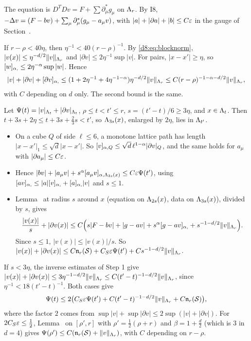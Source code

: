 \begin{detail}\label{d8:scalar}
The equation is $D^TDv=F+\sum\partial^*_\mu g_\mu$ on $\Lambda_r$. By I8, $-\Delta v=(F-bv)+\sum_\mu\partial^*_\mu(g_\mu-a_\mu v)$, with $|a|+|\partial a|+|b|\le C\varepsilon$ in the gauge of Section~.
\begin{step}
If $r-\rho<40\eta$, then $\eta^{-1}<40(r-\rho)^{-1}$. By \eqref{d8:eq:blocknorm}, $|v(x)|\le\eta^{-d/2}\|v\|_{\Lambda_r}$ and $|\partial v|\le2\eta^{-1}\sup|v|$. For pairs, $|x-x'|\ge\eta$, so $[w]_{\alpha,}\le2\eta^{-\alpha}\sup|w|$. Hence
\[
|v|+|\partial v|+[\partial v]_{\alpha,}\le(1+2\eta^{-1}+4\eta^{-1-\alpha})\eta^{-d/2}\|v\|_{\Lambda_r}\le C(r-\rho)^{-1-\alpha-d/2}\|v\|_{\Lambda_r},
\]
with $C$ depending on $d$ only. The second bound is the same.
\end{step}
\begin{step}
Let $\Psi(t)=|v|_{\Lambda_t}+|\partial v|_{\Lambda_t}$, $\rho\le t<t'\le r$, $s=(t'-t)/6\ge3\eta$, and $x\in\Lambda_t$. Then $t+3s+2\eta\le t+3s+\frac23s<t'$, so $\Lambda_{3s}(x)$, enlarged by $2\eta$, lies in $\Lambda_{t'}$.
\begin{itemize}
\item On a cube $Q$ of side $\ell\le6$, a monotone lattice path has length $|x-x'|_1\le\sqrt d|x-x'|$. So $[v]_{\alpha,Q}\le\sqrt d\,\ell^{1-\alpha}|\partial v|_Q$, and the same holds for $a_\mu$ with $|\partial a_\mu|\le C\varepsilon$.
\item Hence $|bv|+|a_\mu v|+s^\alpha[a_\mu v]_{\alpha,\Lambda_{3s}(x)}\le C\varepsilon\Psi(t')$, using $[a v]_{\alpha,}\le|a|[v]_{\alpha,}+[a]_{\alpha,}|v|$ and $s\le1$.
\item Lemma~ at radius $s$ around $x$ (equation on $\Lambda_{2s}(x)$, data on $\Lambda_{3s}(x)$), divided by $s$, gives
\[
\frac{|v(x)|}s+|\partial v(x)|\le C\Big(s|F-bv|+|g-av|+s^\alpha[g-av]_{\alpha,}+s^{-1-d/2}\|v\|_{\Lambda_r}\Big).
\]
Since $s\le1$, $|v(x)|\le|v(x)|/s$. So $|v(x)|+|\partial v(x)|\le C\mathfrak n_r(\mathcal S)+C_S\varepsilon\Psi(t')+Cs^{-1-d/2}\|v\|_{\Lambda_r}$.
\end{itemize}
If $s<3\eta$, the inverse estimates of Step 1 give $|v(x)|+|\partial v(x)|\le3\eta^{-1-d/2}\|v\|_{\Lambda_r}\le C(t'-t)^{-1-d/2}\|v\|_{\Lambda_r}$, since $\eta^{-1}<18(t'-t)^{-1}$. Both cases give
\[
\Psi(t)\le2\big(C_S\varepsilon\Psi(t')+C(t'-t)^{-1-d/2}\|v\|_{\Lambda_r}+C\mathfrak n_r(\mathcal S)\big),
\]
where the factor $2$ comes from $\sup|v|+\sup|\partial v|\le2\sup(|v|+|\partial v|)$. For $2C_S\varepsilon\le\frac12$, Lemma~ on $[\rho',r]$ with $\rho'=\frac12(\rho+r)$ and $\beta=1+\frac d2$ (which is $3$ in $d=4$) gives $\Psi(\rho')\le C(\mathfrak n_r(\mathcal S)+\|v\|_{\Lambda_r})$, with $C$ depending on $r-\rho$.

\end{step}
\end{detail}
